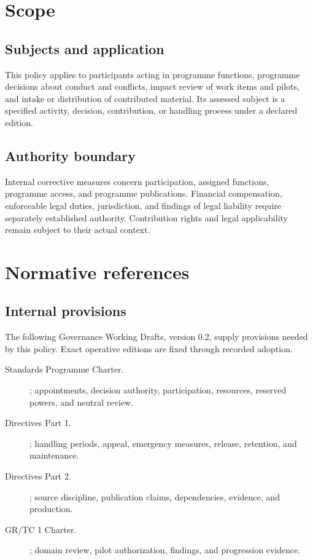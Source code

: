 \documentclass[11pt,a4paper]{article}
\begin{document}
\section{Scope}
\subsection{Subjects and application}
This policy applies to participants acting in programme functions, programme decisions about conduct and conflicts, impact review of work items and pilots, and intake or distribution of contributed material. Its assessed subject is a specified activity, decision, contribution, or handling process under a declared edition.


\subsection{Authority boundary}
Internal corrective measures concern participation, assigned functions, programme access, and programme publications. Financial compensation, enforceable legal duties, jurisdiction, and findings of legal liability require separately established authority. Contribution rights and legal applicability remain subject to their actual context.

\section{Normative references}
\subsection{Internal provisions}
The following Governance Working Drafts, version 0.2, supply provisions needed by this policy. Exact operative editions are fixed through recorded adoption.

\begin{description}
\item[Standards Programme Charter.] ; appointments, decision authority, participation, resources, reserved powers, and neutral review.
\item[Directives Part 1.] ; handling periods, appeal, emergency measures, release, retention, and maintenance.
\item[Directives Part 2.] ; source discipline, publication claims, dependencies, evidence, and production.
\item[GR/TC 1 Charter.] ; domain review, pilot authorization, findings, and progression evidence.
\end{description}
\end{document}
